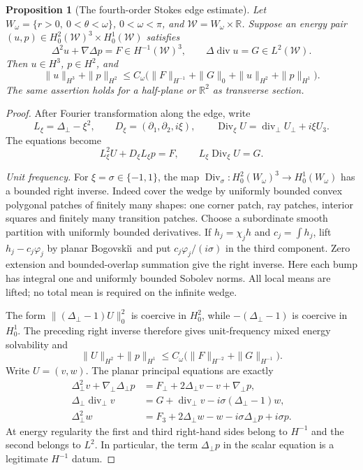 \documentclass[11pt,a4paper]{article}
\newtheorem{proposition}[theorem]{Proposition}
\theoremstyle{remark}
\numberwithin{equation}{section}
\begin{document}
\begin{proposition}[The fourth-order Stokes edge estimate]\label{prop:g-edge}
Let $W_\omega=\{r>0,\ 0<\theta<\omega\}$, $0<\omega<\pi$, and
$\mathcal W=W_\omega\times\mathbb R$. Suppose an energy pair
$(u,p)\in H^2_0(\mathcal W)^3\times H^1_0(\mathcal W)$ satisfies
\[
 \Delta^2u+\nabla\Delta p=F\in H^{-1}(\mathcal W)^3,
 \qquad \Delta\operatorname{div}u=G\in L^2(\mathcal W).
\]
Then $u\in H^3$, $p\in H^2$, and
\begin{equation}\label{eq:g-edge-estimate}
 \|u\|_{H^3}+\|p\|_{H^2}
 \le C_\omega\bigl(\|F\|_{H^{-1}}+\|G\|_0+
                              \|u\|_{H^2}+\|p\|_{H^1}\bigr).
\end{equation}
The same assertion holds for a half-plane or $\mathbb R^2$ as transverse
section.
\end{proposition}
\begin{proof}
After Fourier transformation along the edge, write
\[
 L_\xi=\Delta_\perp-\xi^2,\qquad
 D_\xi=(\partial_1,\partial_2,i\xi),\qquad
 \operatorname{Div}_\xi U=\operatorname{div}_\perp U_\perp+i\xi U_3.
\]
The equations become
\begin{equation}\label{eq:g-edge-fourier-reduction}
 L_\xi^2U+D_\xi L_\xi p=F,\qquad
 L_\xi\operatorname{Div}_\xi U=G.
\end{equation}

\emph{Unit frequency.}
For $\xi=\sigma\in\{-1,1\}$, the map
$\operatorname{Div}_\sigma:H^2_0(W_\omega)^3\to H^1_0(W_\omega)$ has a
bounded right inverse. Indeed cover the wedge by uniformly bounded convex
polygonal patches of finitely many shapes: one corner patch, ray patches,
interior squares and finitely many transition patches. Choose a subordinate
smooth partition with uniformly bounded derivatives. If $h_j=\chi_jh$ and
$c_j=\int h_j$, lift $h_j-c_j\varphi_j$ by planar Bogovski\u\i\ and put
$c_j\varphi_j/(i\sigma)$ in the third component. Zero extension and
bounded-overlap summation give the right inverse. Here each bump has integral
one and uniformly bounded Sobolev norms. All local means are lifted; no total
mean is required on the infinite wedge.

The form $\|(\Delta_\perp-1)U\|_0^2$ is coercive in $H^2_0$, while
$-(\Delta_\perp-1)$ is coercive in $H^1_0$. The preceding right inverse
therefore gives unit-frequency mixed energy solvability and
\[
 \|U\|_{H^2}+\|p\|_{H^1}
 \le C_\omega\bigl(\|F\|_{H^{-2}}+\|G\|_{H^{-1}}\bigr).
\]
Write $U=(v,w)$. The planar principal equations are exactly
\[
 \begin{split}
 \Delta_\perp^2v+\nabla_\perp\Delta_\perp p
    &=F_\perp+2\Delta_\perp v-v+\nabla_\perp p,\\
 \Delta_\perp\operatorname{div}_\perp v
    &=G+\operatorname{div}_\perp v-i\sigma(\Delta_\perp-1)w,\\
 \Delta_\perp^2w
    &=F_3+2\Delta_\perp w-w-i\sigma\Delta_\perp p+i\sigma p.
 \end{split}
\]
At energy regularity the first and third right-hand sides belong to $H^{-1}$
and the second belongs to $L^2$. In particular, the term
$\Delta_\perp p$ in the scalar equation is a legitimate $H^{-1}$ datum.


\end{proof}
\end{document}
